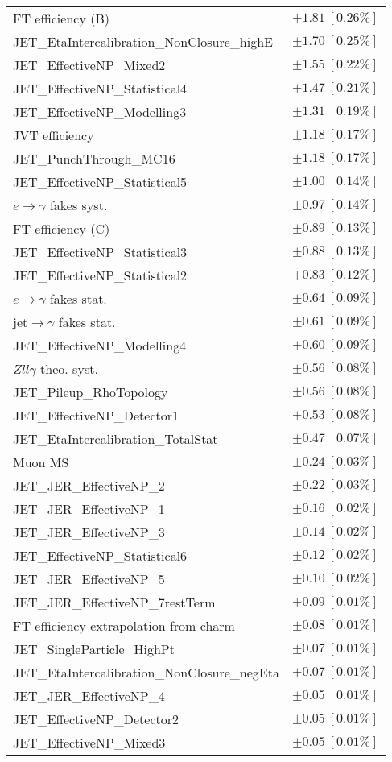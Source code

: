 \begin{tabular}{lr}
FT efficiency (B) & $\pm 1.81\ [0.26\%]$ \\
JET\_EtaIntercalibration\_NonClosure\_highE & $\pm 1.70\ [0.25\%]$ \\
JET\_EffectiveNP\_Mixed2 & $\pm 1.55\ [0.22\%]$ \\
JET\_EffectiveNP\_Statistical4 & $\pm 1.47\ [0.21\%]$ \\
JET\_EffectiveNP\_Modelling3 & $\pm 1.31\ [0.19\%]$ \\
JVT efficiency & $\pm 1.18\ [0.17\%]$ \\
JET\_PunchThrough\_MC16 & $\pm 1.18\ [0.17\%]$ \\
JET\_EffectiveNP\_Statistical5 & $\pm 1.00\ [0.14\%]$ \\
$e\to\gamma$ fakes syst. & $\pm 0.97\ [0.14\%]$ \\
FT efficiency (C) & $\pm 0.89\ [0.13\%]$ \\
JET\_EffectiveNP\_Statistical3 & $\pm 0.88\ [0.13\%]$ \\
JET\_EffectiveNP\_Statistical2 & $\pm 0.83\ [0.12\%]$ \\
$e\to\gamma$ fakes stat. & $\pm 0.64\ [0.09\%]$ \\
jet$\to\gamma$ fakes stat. & $\pm 0.61\ [0.09\%]$ \\
JET\_EffectiveNP\_Modelling4 & $\pm 0.60\ [0.09\%]$ \\
$Zll\gamma$ theo. syst. & $\pm 0.56\ [0.08\%]$ \\
JET\_Pileup\_RhoTopology & $\pm 0.56\ [0.08\%]$ \\
JET\_EffectiveNP\_Detector1 & $\pm 0.53\ [0.08\%]$ \\
JET\_EtaIntercalibration\_TotalStat & $\pm 0.47\ [0.07\%]$ \\
Muon MS & $\pm 0.24\ [0.03\%]$ \\
JET\_JER\_EffectiveNP\_2 & $\pm 0.22\ [0.03\%]$ \\
JET\_JER\_EffectiveNP\_1 & $\pm 0.16\ [0.02\%]$ \\
JET\_JER\_EffectiveNP\_3 & $\pm 0.14\ [0.02\%]$ \\
JET\_EffectiveNP\_Statistical6 & $\pm 0.12\ [0.02\%]$ \\
JET\_JER\_EffectiveNP\_5 & $\pm 0.10\ [0.02\%]$ \\
JET\_JER\_EffectiveNP\_7restTerm & $\pm 0.09\ [0.01\%]$ \\
FT efficiency extrapolation from charm & $\pm 0.08\ [0.01\%]$ \\
JET\_SingleParticle\_HighPt & $\pm 0.07\ [0.01\%]$ \\
JET\_EtaIntercalibration\_NonClosure\_negEta & $\pm 0.07\ [0.01\%]$ \\
JET\_JER\_EffectiveNP\_4 & $\pm 0.05\ [0.01\%]$ \\
JET\_EffectiveNP\_Detector2 & $\pm 0.05\ [0.01\%]$ \\
JET\_EffectiveNP\_Mixed3 & $\pm 0.05\ [0.01\%]$ \\
\hline
\end{tabular}
